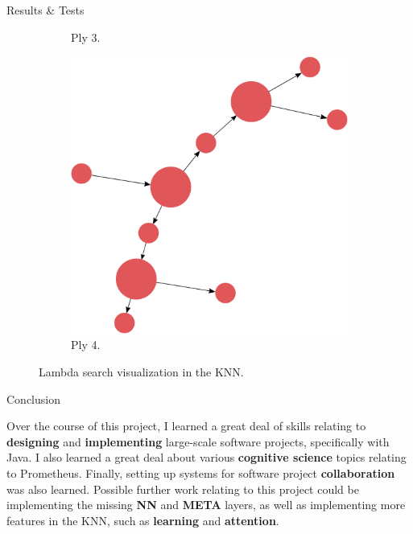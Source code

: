 \documentclass[final]{beamer} %
\begin{document}
\begin{frame}
\begin{columns}
\begin{column}{.33\textwidth}
{\begin{block}{Results \& Tests}
\begin{figure}[!htb]
\begin{subfigure}[!htb]{0.19\columnwidth}
							\caption{Ply 3.}
						\end{subfigure}
						\begin{subfigure}[!htb]{0.19\columnwidth}
							\centering
							\includegraphics[width=\columnwidth]{figures/knn_simple_lambda_think_4.pdf}
							\caption{Ply 4.}
						\end{subfigure}
						\caption{Lambda search visualization in the KNN.}
						\label{fig:lambda_search_test}
					\end{figure}
				
				\end{block}
				\begin{block}{Conclusion}
					\parbox{0.99\textwidth}{
						Over the course of this project, I learned a great deal of skills relating to \textbf{designing} and \textbf{implementing} large-scale software projects, specifically with Java. I also learned a great deal about various \textbf{cognitive science} topics relating to Prometheus. Finally, setting up systems for software project \textbf{collaboration} was also learned. Possible further work relating to this project could be implementing the missing \textbf{NN} and \textbf{META} layers, as well as implementing more features in the KNN, such as \textbf{learning} and \textbf{attention}.}
				\end{block}
			}
			\end{column}
		\end{columns}
	\end{frame}
\end{document}
